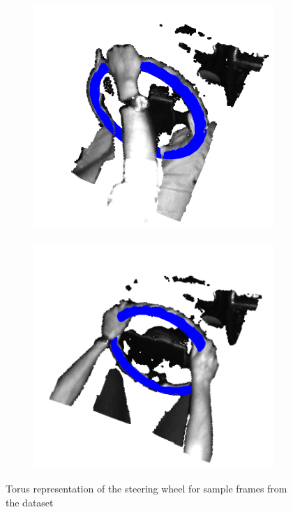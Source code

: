\begin{figure}[ht]
\begin{subfigure}[t]{0.3\textwidth}
    \end{subfigure}\hfill
    \begin{subfigure}[t]{0.3\textwidth}
        \centering
        \includegraphics[width=\textwidth]{media/chapter 3/torus5.png}
    \end{subfigure}\hfill
    \begin{subfigure}[t]{0.3\textwidth}
        \centering
        \includegraphics[width=\textwidth]{media/chapter 3/torus6.png}
    \end{subfigure}
    \caption{Torus representation of the steering wheel 
    for sample frames from the dataset}
    \label{fig:sample_toruses}
\end{figure}
